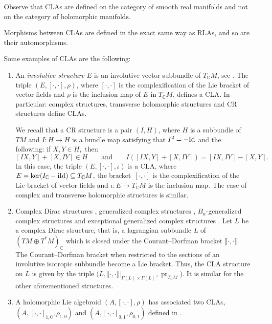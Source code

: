 \documentclass[pdftex]{sigma}
\numberwithin{equation}{section}
\newcommand{\C}{{\mathbb{C}}}
\DeclareMathOperator{\pr}{pr}
\begin{document}
\begin{Remark}
Observe that CLAs are defined on the category of smooth real manifolds and not on the category of holomorphic manifolds.
\end{Remark}
Morphisms between CLAs are defined in the exact same way as RLAs, and so are their automorphisms.
\begin{Examples}\label{examples_0}\normalfont Some examples of CLAs are the following:\samepage
\begin{enumerate}\itemsep=0pt
\item An {\em involutive structure} $E$ is an involutive vector subbundle of $T_{\C} M$, see \cite{treves2014hypo}. The triple $(E, [\cdot,\cdot], \rho)$, where $[\cdot,\cdot]$ is the complexification of the Lie bracket of vector fields and $\rho$ is the inclusion map of $E$ in $T_{\C}M$, defines a CLA. In particular: complex structures, transverse holomorphic structures and CR structures define CLAs.

We recall that a CR structure is a pair $(I,H)$, where $H$ is a subbundle of $TM$ and ${I\colon H\to H}$ is a bundle map satisfying that $I^2=-{\rm Id}$ and the following: if ${X, Y\in H}$,~then
\[
  [IX,Y]+[X, IY]\in H\qquad \text{and}\qquad I([IX,Y]+[X, IY])=[IX,IY]-[X, Y].
\]
In this case, the triple $(E, [\cdot,\cdot], \iota)$ is a CLA, where $E=\ker(I_{\C}-{\rm i}{\rm Id})\subseteq T_{\C}M$, the bracket~$[\cdot,\cdot]$ is the complexification of the Lie bracket of vector fields and $\iota\colon E\to T_{\C}M$ is the inclusion map. The case of complex and transverse holomorphic structures is similar.

\item Complex Dirac structures \cite{aguero2022complex}, generalized complex structures \cite{gualtieri:2004}, $B_n$-generalized complex structures \cite{rubio2014generalized} and exceptional generalized complex structures \cite{tennyson2021exceptional}. Let $L$ be a complex Dirac structure, that is, a lagrangian subbundle $L$ of $(TM\oplus T^*M)_{\C}$ which is closed under the Courant--Dorfman bracket $\llbracket\cdot,\cdot\rrbracket$. The Courant--Dorfman bracket when restricted to the sections of an involutive isotropic subbundle become a Lie bracket. Thus, the CLA structure on $L$ is given by the triple $(L,\llbracket \cdot,\cdot\rrbracket|_{\Gamma(L)\times \Gamma(L)}, \pr_{T_{\C}M}$). It is similar for the other aforementioned structures.
\item A holomorphic Lie algebroid $(A, [\cdot,\cdot],\rho)$ has associated two CLAs, $(A, [\cdot,\cdot]_{1,0},\rho_{1,0})$ and $(A, [\cdot,\cdot]_{0,1},\rho_{0,1})$ defined in \cite[Section~3.4]{laurent2008holomorphic}.


\end{enumerate}
\end{Examples}
\end{document}
